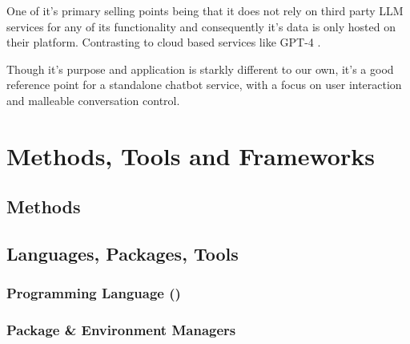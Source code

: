 \documentclass[11pt]{article}
\newcounter{subsubsubsection}[subsubsection]
\begin{document}
One of it's primary selling points being that it does not rely on third party LLM services for any of its functionality and consequently it's data is only hosted on their platform. Contrasting to cloud based services like GPT-4 \cite{gpt4}.

Though it's purpose and application is starkly different to our own, it's a good reference point for a standalone chatbot service, with a focus on user interaction and malleable conversation control.

\section{Methods, Tools and Frameworks} \label{methods-tools-frameworks}


\subsection{Methods} \label{methods}

   



             
\subsection{Languages, Packages, Tools} \label{languages-packages-tools}

\subsubsection{Programming Language (\cite{python})} \label{programming-language}

\subsubsection{Package \& Environment Managers} \label{package-environment-manager}


\end{document}
